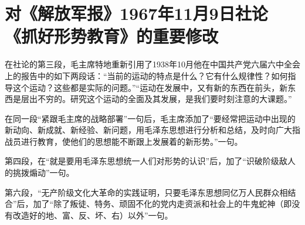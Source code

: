 \section[对《解放军报》1967年11月9日社论《抓好形势教育》的重要修改（一九六七年十一月）]{对《解放军报》1967年11月9日社论《抓好形势教育》的重要修改}


在社论的第三段，毛主席特地重新引用了1938年10月他在中国共产党六届六中全会上的报告中的如下两段话：“当前的运动的特点是什么？它有什么规律性？如何指导这个运动？这些都是实际的问题。”“运动在发展中，又有新的东西在前头，新东西是层出不穷的。研究这个运动的全面及其发展，是我们要时刻注意的大课题。”


在同一段“紧跟毛主席的战略部署”一句后，毛主席添加了“要经常把运动中出现的新动向、新成就、新经验、新问题，用毛泽东思想进行分析和总结，及时向广大指战员进行教育，使他们的思想能不断跟上发展着的新形势。”一句。

第四段，在“就是要用毛泽东思想统一人们对形势的认识”后，加了“识破阶级敌人的挑拨煽动”一句。

第六段，“无产阶级文化大革命的实践证明，只要毛泽东思想同亿万人民群众相结合”后，加了“除了叛徒、特务、顽固不化的党内走资派和社会上的牛鬼蛇神（即没有改造好的地、富、反、坏、右）以外”一句。

